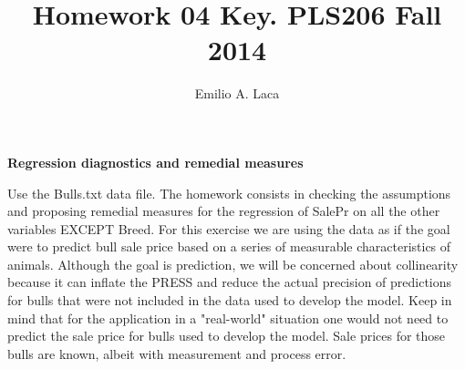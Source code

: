 \documentclass[letterpaper]{article}
\title{Homework 04 Key. PLS206 Fall 2014}
\author{Emilio A. Laca}
\begin{document}


\maketitle

{\bf \Large Regression diagnostics and remedial measures}

Use the Bulls.txt data file. The homework consists in checking the assumptions and proposing remedial measures for the regression of SalePr on all the other variables EXCEPT Breed. For this exercise we are using the data as if the goal were to predict bull sale price based on a series of measurable characteristics of animals. Although the goal is prediction, we will be concerned about collinearity because it can inflate the PRESS and reduce the actual precision of predictions for bulls that were not included in the data used to develop the model. Keep in mind that for the application in a "real-world" situation one would not need to predict the sale price for bulls used to develop the model. Sale prices for those bulls are known, albeit with measurement and process error. 
\end{document}
